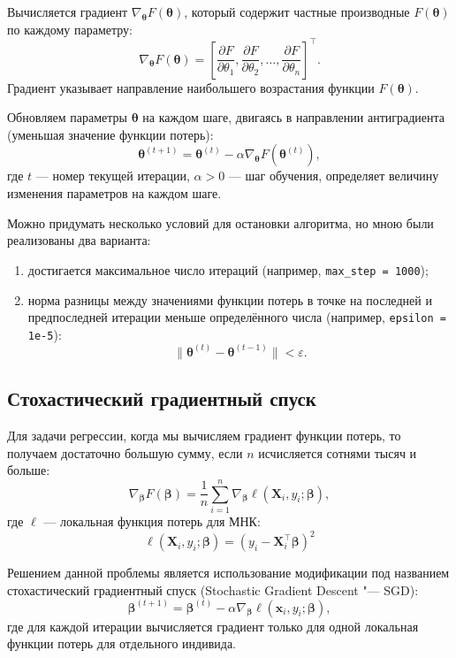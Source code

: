 \documentclass[12pt]{article}
\begin{document}
	Вычисляется градиент $ \nabla_{\boldsymbol{\theta}} F(\boldsymbol{\theta}) $, который содержит частные производные $ F(\boldsymbol{\theta}) $ по каждому параметру:
	\[
	\nabla_{\boldsymbol{\theta}} F(\boldsymbol{\theta}) = \left[\frac{\partial F}{\partial \theta_1}, \frac{\partial F}{\partial \theta_2}, \ldots, \frac{\partial F}{\partial \theta_n}\right]^\top.
	\]
	Градиент указывает направление наибольшего возрастания функции $ F(\boldsymbol{\theta}) $.
	
	Обновляем параметры $ \boldsymbol{\theta} $ на каждом шаге, двигаясь в направлении антиградиента (уменьшая значение функции потерь):
	\[
	\boldsymbol{\theta}^{(t+1)} = \boldsymbol{\theta}^{(t)} - \alpha \nabla_{\boldsymbol{\theta}} F(\boldsymbol{\theta}^{(t)}),
	\]
	где $ t $ — номер текущей итерации, $ \alpha > 0 $ — шаг обучения, определяет величину изменения параметров на каждом шаге.
	
	Можно придумать несколько условий для остановки алгоритма, но мною были реализованы два варианта:
	\begin{enumerate}
		\item достигается максимальное число итераций (например, \verb|max_step = 1000|);
		
		\item норма разницы между значениями функции потерь в точке на последней и предпоследней итерации меньше определённого числа (например, \verb|epsilon = 1e-5|):
		\[
		\|\boldsymbol{\theta}^{(t)} - \boldsymbol{\theta}^{(t-1)}\| < \varepsilon.
		\]
	\end{enumerate}
	
	\subsection{Стохастический градиентный спуск}
	
	Для задачи регрессии, когда мы вычисляем градиент функции потерь, то получаем достаточно большую сумму, если $n$ исчисляется сотнями тысяч и больше:
	\[
	\nabla_{\boldsymbol{\beta}} F(\boldsymbol{\beta}) = \frac{1}{n} \sum_{i=1}^n \nabla_{\boldsymbol{\beta}} \ell(\mathbf{X}_i, y_i; \boldsymbol{\beta}),
	\]
	где $ \ell $ — локальная функция потерь для МНК:
	\[
	\ell(\mathbf{X}_i, y_i; \boldsymbol{\beta}) = (y_i - \mathbf{X}_i^\top \boldsymbol{\beta})^2
	\]
	
	Решением данной проблемы является использование модификации под названием стохастический градиентный спуск (Stochastic Gradient Descent "--- SGD):
	\[
	\boldsymbol{\beta}^{(t+1)} = \boldsymbol{\beta}^{(t)} - \alpha \nabla_{\boldsymbol{\beta}} \ell(\mathbf{x}_i, y_i; \boldsymbol{\beta}),
	\]
	где для каждой итерации вычисляется градиент только для одной локальная функции потерь для отдельного индивида.
	
\end{document}
